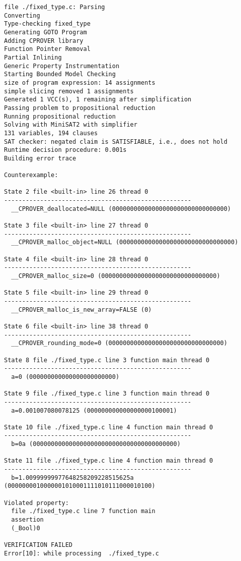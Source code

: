 \begin{lstlisting}
file ./fixed_type.c: Parsing
Converting
Type-checking fixed_type
Generating GOTO Program
Adding CPROVER library
Function Pointer Removal
Partial Inlining
Generic Property Instrumentation
Starting Bounded Model Checking
size of program expression: 14 assignments
simple slicing removed 1 assignments
Generated 1 VCC(s), 1 remaining after simplification
Passing problem to propositional reduction
Running propositional reduction
Solving with MiniSAT2 with simplifier
131 variables, 194 clauses
SAT checker: negated claim is SATISFIABLE, i.e., does not hold
Runtime decision procedure: 0.001s
Building error trace

Counterexample:

State 2 file <built-in> line 26 thread 0
----------------------------------------------------
  __CPROVER_deallocated=NULL (00000000000000000000000000000000)

State 3 file <built-in> line 27 thread 0
----------------------------------------------------
  __CPROVER_malloc_object=NULL (00000000000000000000000000000000)

State 4 file <built-in> line 28 thread 0
----------------------------------------------------
  __CPROVER_malloc_size=0 (00000000000000000000000000000000)

State 5 file <built-in> line 29 thread 0
----------------------------------------------------
  __CPROVER_malloc_is_new_array=FALSE (0)

State 6 file <built-in> line 38 thread 0
----------------------------------------------------
  __CPROVER_rounding_mode=0 (00000000000000000000000000000000)

State 8 file ./fixed_type.c line 3 function main thread 0
----------------------------------------------------
  a=0 (000000000000000000000000)

State 9 file ./fixed_type.c line 3 function main thread 0
----------------------------------------------------
  a=0.001007080078125 (000000000000000000100001)

State 10 file ./fixed_type.c line 4 function main thread 0
----------------------------------------------------
  b=0a (0000000000000000000000000000000000000000)

State 11 file ./fixed_type.c line 4 function main thread 0
----------------------------------------------------
  b=1.00999999977648258209228515625a (0000000010000001010001111010111000010100)

Violated property:
  file ./fixed_type.c line 7 function main
  assertion
  (_Bool)0

VERIFICATION FAILED
Error[10]: while processing  ./fixed_type.c
\end{lstlisting}


